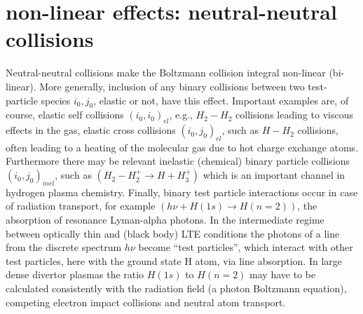\newpage

\section{non-linear effects: neutral-neutral collisions}  \label{sec1.8}
Neutral-neutral collisions make the Boltzmann collision integral
non-linear (bi-linear). More generally, inclusion of any binary
collisions between two test-particle species $i_0, j_0$, elastic
or not, have this effect. Important examples are, of course,
elastic self collisions $(i_0,i_0)_{el}$, e.g., $H_2-H_2$
collisions leading to viscous effects in the gas, elastic cross
collisions $(i_0,j_0)_{el}$, such as $H-H_2$ collisions, often
leading to a heating of the molecular gas due to hot charge
exchange atoms. Furthermore there may be relevant inelastic (chemical) binary
particle collisions $(i_0,j_0)_{inel}$, such as $(H_2-H^+_2
\rightarrow H+H_3^+)$ which is an important channel in hydrogen
plasma chemistry. Finally, binary test particle interactions occur in case of radiation transport, 
for example $(h\nu + H(1s) \rightarrow H(n=2))$, the
absorption of resonance Lyman-alpha photons. In the intermediate regime between optically thin and (black body) LTE
conditions the photons of a line from the discrete spectrum $h\nu$ become ``test particles'', 
which interact with other test particles, here with the ground state H atom, via line absorption.
In large dense divertor plasmas the ratio $H(1s)$ to
$H(n=2)$ may have to be calculated consistently with the radiation
field (a photon Boltzmann equation), competing electron impact
collisions and neutral atom transport.

